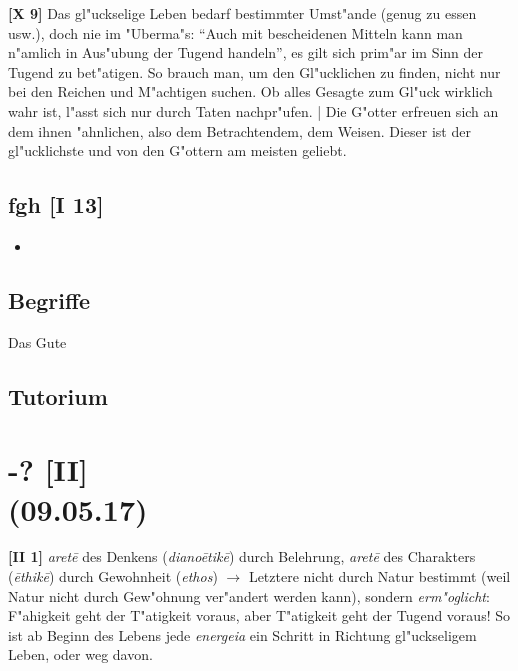 \documentclass[emulatestandardclasses]{scrartcl}
\begin{document}
\noindent \textbf{[X 9]} Das gl"uckselige Leben bedarf bestimmter Umst"ande (genug zu essen usw.), doch nie im "Uberma"s: "`Auch mit bescheidenen Mitteln kann man n"amlich in Aus"ubung der Tugend handeln"', es gilt sich prim"ar im Sinn der Tugend zu bet"atigen. So brauch man, um den Gl"ucklichen zu finden, nicht nur bei den Reichen und M"achtigen suchen. Ob alles Gesagte zum Gl"uck wirklich wahr ist, l"asst sich nur durch Taten nachpr"ufen. | Die G"otter erfreuen sich an dem ihnen "ahnlichen, also dem Betrachtendem, dem Weisen. Dieser ist der gl"ucklichste und von den G"ottern am meisten geliebt.

\subsection{fgh [I 13]}

\begin{itemize}
  \item 
\end{itemize}

\subsection{Begriffe}

\begin{description}[leftmargin=!,labelwidth=\widthof{\bfseries \emph{eudaemonia}}]
  \item[\emph{agathon}] Das Gute
\end{description}

\subsection{Tutorium}


\section{-? [II]\\(09.05.17)}

\textbf{[II 1]} \emph{aret\={e}} des Denkens (\emph{diano\={e}tik\={e}}) durch Belehrung, \emph{aret\={e}} des Charakters (\emph{\={e}thik\={e}}) durch Gewohnheit (\emph{ethos}) $\rightarrow$ Letztere nicht durch Natur bestimmt (weil Natur nicht durch Gew"ohnung ver"andert werden kann), sondern \emph{erm"oglicht}: F"ahigkeit geht der T"atigkeit voraus, aber T"atigkeit geht der Tugend voraus! So ist ab Beginn des Lebens jede \emph{energeia} ein Schritt in Richtung gl"uckseligem Leben, oder weg davon. \newline
\end{document}
